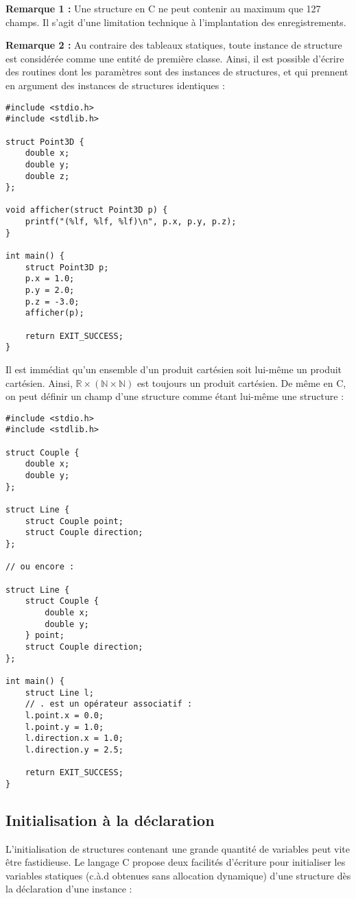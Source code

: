 \documentclass[../../../main.tex]{subfiles}
\begin{document}
\textbf{Remarque 1 :} Une structure en C ne peut contenir au maximum que 127 champs. Il s'agit d'une limitation technique à l'implantation des enregistrements.
 
\textbf{Remarque 2 :} Au contraire des tableaux statiques, toute instance de structure est considérée comme une entité de première classe. Ainsi, il est possible d'écrire des routines dont les paramètres sont des instances de structures, et qui prennent en argument des instances de structures identiques :
\begin{verbatim}
#include <stdio.h>
#include <stdlib.h>

struct Point3D {
	double x;
	double y;
	double z;
};

void afficher(struct Point3D p) {
	printf("(%lf, %lf, %lf)\n", p.x, p.y, p.z);
}

int main() {
	struct Point3D p;
	p.x = 1.0;
	p.y = 2.0;
	p.z = -3.0;
	afficher(p);

	return EXIT_SUCCESS;
}
\end{verbatim}
Il est immédiat qu'un ensemble d'un produit cartésien soit lui-même un produit cartésien. Ainsi, $\mathbb{R}\times{(\mathbb{N}\times{\mathbb{N}})}$ est toujours un produit cartésien.
De même en C, on peut définir un champ d'une structure comme étant lui-même une structure :
\begin{verbatim}
#include <stdio.h>
#include <stdlib.h>

struct Couple {
	double x;
	double y;
};

struct Line {
	struct Couple point;
	struct Couple direction;
};

// ou encore :

struct Line {
	struct Couple {
		double x;
		double y;
	} point;
	struct Couple direction;
};

int main() {
	struct Line l;
	// . est un opérateur associatif :
	l.point.x = 0.0;
	l.point.y = 1.0;
	l.direction.x = 1.0;
	l.direction.y = 2.5;

	return EXIT_SUCCESS;
}
\end{verbatim}
\subsection{Initialisation à la déclaration}
\label{sub:initialisation_la_d_claration}
L'initialisation de structures contenant une grande quantité de variables peut vite être fastidieuse. Le langage C propose deux facilités d'écriture pour initialiser les variables statiques (c.à.d obtenues sans allocation dynamique) d'une structure dès la déclaration d'une instance : 
\end{document}
